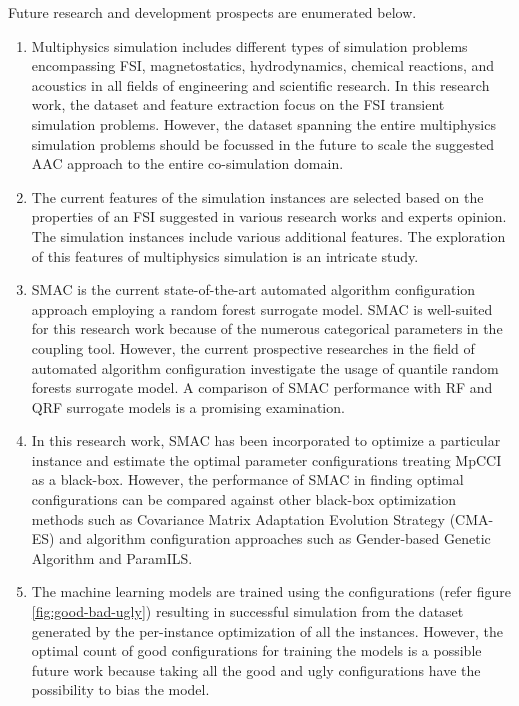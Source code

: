 Future research and development prospects are enumerated below.
\begin{enumerate}
\item Multiphysics simulation includes different types of simulation problems encompassing FSI, magnetostatics, hydrodynamics, chemical reactions, and acoustics in all fields of engineering and scientific research. In this research work, the dataset and feature extraction focus on the FSI transient simulation problems. However, the dataset spanning the entire multiphysics simulation problems should be focussed in the future to scale the suggested AAC approach to the entire co-simulation domain.

\item The current features of the simulation instances are selected based on the properties of an FSI suggested in various research works \cite{FSI_properties} \cite{FSI_properties2} and experts opinion. The simulation instances include various additional features. The exploration of this features of multiphysics simulation is an intricate study.

\item SMAC is the current state-of-the-art automated algorithm configuration approach employing a random forest surrogate model. SMAC is well-suited for this research work because of the numerous categorical parameters in the coupling tool. However, the current prospective researches in the field of automated algorithm configuration investigate the usage of quantile random forests surrogate model. A comparison of SMAC performance with RF and QRF surrogate models is a promising examination.

\item In this research work, SMAC has been incorporated to optimize a particular instance and estimate the optimal parameter configurations treating MpCCI as a black-box. However, the performance of SMAC in finding optimal configurations can be compared against other black-box optimization methods such as Covariance Matrix Adaptation Evolution Strategy (CMA-ES) and algorithm configuration approaches such as Gender-based Genetic Algorithm and ParamILS.

\item The machine learning models are trained using the configurations (refer figure \ref{fig:good-bad-ugly}) resulting in successful simulation from the dataset generated by the per-instance optimization of all the instances. However, the optimal count of good configurations for training the models is a possible future work because taking all the good and ugly configurations have the possibility to bias the model.


\end{enumerate}
